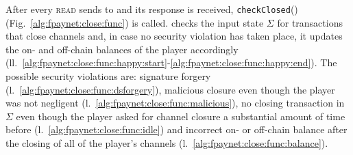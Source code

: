   After every \textsc{read} \fpaynet{} sends to \ledger{} and its response is
  received, \texttt{checkClosed}() (Fig.~\ref{alg:fpaynet:close:func}) is
  called. \fpaynet{} checks the input state $\Sigma$ for transactions that close
  channels and, in case no security violation has taken place, it updates the
  on- and off-chain balances of the player accordingly
  (ll.~\ref{alg:fpaynet:close:func:happy:start}-\ref{alg:fpaynet:close:func:happy:end}).
  The possible security violations are: signature forgery
  (l.~\ref{alg:fpaynet:close:func:dsforgery}), malicious closure even though the
  player was not negligent (l.~\ref{alg:fpaynet:close:func:malicious}), no
  closing transaction in $\Sigma$ even though the player asked for channel
  closure a substantial amount of time before
  (l.~\ref{alg:fpaynet:close:func:idle}) and incorrect on- or off-chain balance
  after the closing of all of the player's channels
  (l.~\ref{alg:fpaynet:close:func:balance}).

